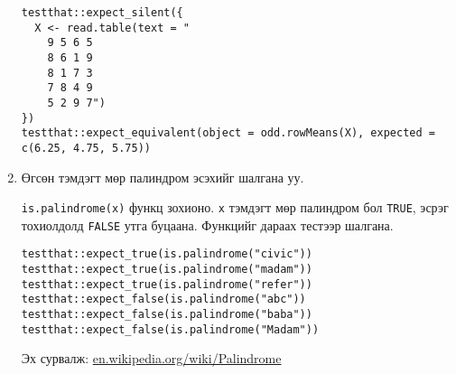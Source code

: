 \documentclass[11pt]{letter}
\begin{document}
\begin{enumerate}
\begin{lstlisting}[keywords={c},otherkeywords={odd.rowMeans,read.table,expect_silent,expect_equivalent}]
testthat::expect_silent({
  X <- read.table(text = "
    9 5 6 5
    8 6 1 9
    8 1 7 3
    7 8 4 9
    5 2 9 7")
})
testthat::expect_equivalent(object = odd.rowMeans(X), expected = c(6.25, 4.75, 5.75))
\end{lstlisting}
\item Өгсөн тэмдэгт мөр палиндром эсэхийг шалгана уу.
\par
\lstinline[otherkeywords={is.palindrome}]|is.palindrome(x)| функц зохионо. \lstinline|x| тэмдэгт мөр палиндром бол \lstinline|TRUE|, эсрэг тохиолдолд \lstinline|FALSE| утга буцаана. Функцийг дараах тестээр шалгана.
\begin{lstlisting}[otherkeywords={is.palindrome,expect_true,expect_false}]
testthat::expect_true(is.palindrome("civic"))
testthat::expect_true(is.palindrome("madam"))
testthat::expect_true(is.palindrome("refer"))
testthat::expect_false(is.palindrome("abc"))
testthat::expect_false(is.palindrome("baba"))
testthat::expect_false(is.palindrome("Madam"))
\end{lstlisting}
Эх сурвалж: \href{https://en.wikipedia.org/wiki/Palindrome}{en.wikipedia.org/wiki/Palindrome}
\end{enumerate}
\end{document}
